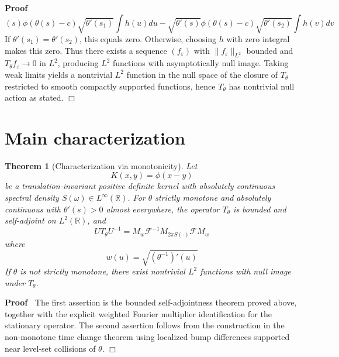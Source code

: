 \documentclass{article}
\newcommand{\cdummy}{\cdot}
\newenvironment{proof}{\noindent\textbf{Proof\ }}{\hspace*{\fill}$\Box$\medskip}
{\theorembodyfont{\rmfamily}\newtheorem{example}{Example}}
\newtheorem{theorem}{Theorem}
\begin{document}
\begin{proof}
\begin{equation}
{    (s)} \phi (\theta (s) - c)  \sqrt{\theta' (s_1)}  \int h (u) du -
    \sqrt{\theta' (s)} \phi (\theta (s) - c)  \sqrt{\theta' (s_2)}  \int h (v)
    dv
  \end{equation}
  If $\theta' (s_1) = \theta' (s_2)$, this equals zero. Otherwise, choosing
  $h$ with zero integral makes this zero. Thus there exists a sequence
  $(f_{\varepsilon})$ with $\|f_{\varepsilon} \|_{L^2}$ bounded and
  $T_{\theta} f_{\varepsilon} \to 0$ in $L^2$, producing $L^2$ functions with
  asymptotically null image. Taking weak limits yields a nontrivial $L^2$
  function in the null space of the closure of $T_{\theta}$ restricted to
  smooth compactly supported functions, hence $T_{\theta}$ has nontrivial null
  action as stated.
\end{proof}

\section{Main characterization}

\begin{theorem}[Characterization via monotonicity]
  Let
  \begin{equation}
    K (x, y) = \phi (x - y)
  \end{equation}
  be a translation-invariant positive definite kernel with absolutely
  continuous spectral density $S (\omega) \in L^{\infty} (\mathbb{R})$. For
  $\theta$ strictly monotone and absolutely continuous with $\theta' (s) > 0$
  almost everywhere, the operator $T_{\theta}$ is bounded and self-adjoint on
  $L^2 (\mathbb{R})$, and
  \begin{equation}
    UT_{\theta} U^{- 1} = M_w \mathcal{F}^{- 1} M_{2 \pi S (\cdummy)}
    \mathcal{F}M_w
  \end{equation}
  where
  \begin{equation}
    w (u) = \sqrt{(\theta^{- 1})' (u)}
  \end{equation}
  If $\theta$ is not strictly monotone, there exist nontrivial $L^2$ functions
  with null image under $T_{\theta}$.
\end{theorem}

\begin{proof}
  The first assertion is the bounded self-adjointness theorem proved above,
  together with the explicit weighted Fourier multiplier identification for
  the stationary operator. The second assertion follows from the construction
  in the non-monotone time change theorem using localized bump differences
  supported near level-set collisions of $\theta$.
\end{proof}
\end{document}
